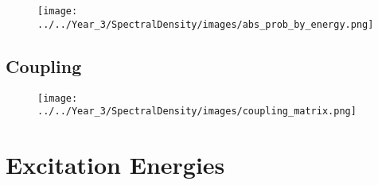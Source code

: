 \begin{figure}
    \texttt{[image: ../../Year\_3/SpectralDensity/images/abs\_prob\_by\_energy.png]}
\end{figure}


\subsection{Coupling}
\label{subsec:coupling}

\begin{figure}
    \texttt{[image: ../../Year\_3/SpectralDensity/images/coupling\_matrix.png]}
\end{figure}

\section{Excitation Energies}
\label{sec:excitation_energies}
